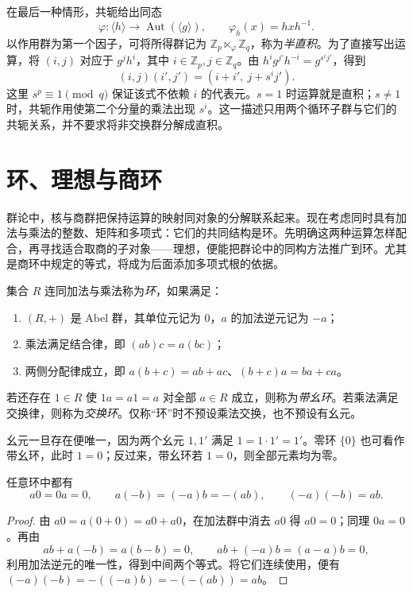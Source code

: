 \documentclass[lang=cn,a4paper,fontset=none,zihao=false,10pt,openany,twoside]{beautybook}
\numberwithin{algorithm}{chapter}
\begin{document}
\begin{remark}[由共轭作用得到半直积]
在最后一种情形，共轭给出同态
\[
 \varphi:\langle h\rangle\longrightarrow\operatorname{Aut}(\langle g\rangle),
 \qquad \varphi_h(x)=hxh^{-1}.
\]
以作用群为第一个因子，可将所得群记为 $\mathbb Z_p\ltimes_\varphi\mathbb Z_q$，称为\emph{半直积}。为了直接写出运算，将 $(i,j)$ 对应于 $g^jh^i$，其中 $i\in\mathbb Z_p,j\in\mathbb Z_q$。由 $h^ig^{j'}h^{-i}=g^{s^i j'}$，得到
\[
 (i,j)(i',j')=(i+i',\ j+s^i j').
\]
这里 $s^p\equiv1\pmod q$ 保证该式不依赖 $i$ 的代表元。$s=1$ 时运算就是直积；$s\ne1$ 时，共轭作用使第二个分量的乘法出现 $s^i$。这一描述只用两个循环子群与它们的共轭关系，并不要求将非交换群分解成直积。
\end{remark}


\section{环、理想与商环}\label{sec:rings-route}
群论中，核与商群把保持运算的映射同对象的分解联系起来。现在考虑同时具有加法与乘法的整数、矩阵和多项式：它们的共同结构是环。先明确这两种运算怎样配合，再寻找适合取商的子对象——理想，便能把群论中的同构方法推广到环。尤其是商环中规定的等式，将成为后面添加多项式根的依据。
\begin{definition}[环、带幺环与交换环]
集合 $R$ 连同加法与乘法称为\emph{环}，如果满足：
\begin{enumerate}[(1)]
\item $(R,+)$ 是 Abel 群，其单位元记为 $0$，$a$ 的加法逆元记为 $-a$；
\item 乘法满足结合律，即 $(ab)c=a(bc)$；
\item 两侧分配律成立，即 $a(b+c)=ab+ac$、$(b+c)a=ba+ca$。
\end{enumerate}
若还存在 $1\in R$ 使 $1a=a1=a$ 对全部 $a\in R$ 成立，则称为\emph{带幺环}。若乘法满足交换律，则称为\emph{交换环}。仅称“环”时不预设乘法交换，也不预设有幺元。
\end{definition}
幺元一旦存在便唯一，因为两个幺元 $1,1'$ 满足 $1=1\cdot1'=1'$。零环 $\{0\}$ 也可看作带幺环，此时 $1=0$；反过来，带幺环若 $1=0$，则全部元素均为零。

\begin{proposition}[零元与负号的乘法]
任意环中都有
\[
 a0=0a=0,\qquad a(-b)=(-a)b=-(ab),\qquad(-a)(-b)=ab.
\]
\end{proposition}
\begin{proof}
由 $a0=a(0+0)=a0+a0$，在加法群中消去 $a0$ 得 $a0=0$；同理 $0a=0$。再由
\[
 ab+a(-b)=a(b-b)=0,\qquad ab+(-a)b=(a-a)b=0,
\]
利用加法逆元的唯一性，得到中间两个等式。将它们连续使用，便有 $(-a)(-b)=-((-a)b)=-(-(ab))=ab$。
\end{proof}
\end{document}
